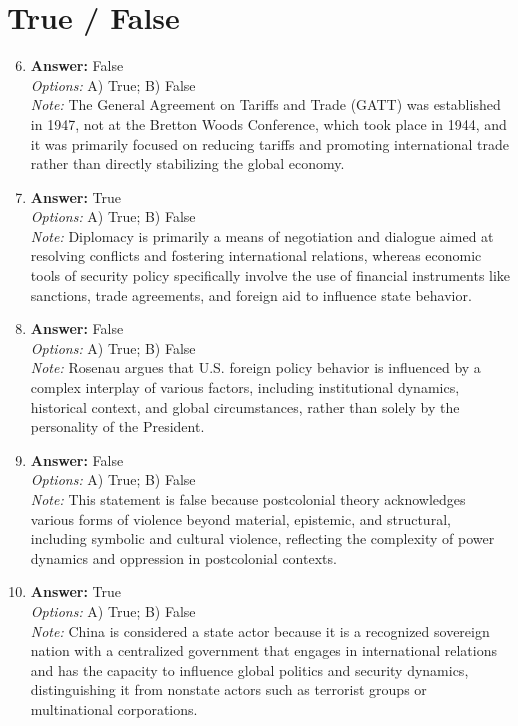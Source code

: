 \documentclass[12pt]{article}
\begin{document}
\section*{True / False}
\begin{enumerate}[label=\arabic*.]
\setcounter{enumi}{5}
\item \textbf{Answer:} False
\\ \textit{Options:} A) True; B) False
\\ \textit{Note:} The General Agreement on Tariffs and Trade (GATT) was established in 1947, not at the Bretton Woods Conference, which took place in 1944, and it was primarily focused on reducing tariffs and promoting international trade rather than directly stabilizing the global economy.
\item \textbf{Answer:} True
\\ \textit{Options:} A) True; B) False
\\ \textit{Note:} Diplomacy is primarily a means of negotiation and dialogue aimed at resolving conflicts and fostering international relations, whereas economic tools of security policy specifically involve the use of financial instruments like sanctions, trade agreements, and foreign aid to influence state behavior.
\item \textbf{Answer:} False
\\ \textit{Options:} A) True; B) False
\\ \textit{Note:} Rosenau argues that U.S. foreign policy behavior is influenced by a complex interplay of various factors, including institutional dynamics, historical context, and global circumstances, rather than solely by the personality of the President.
\item \textbf{Answer:} False
\\ \textit{Options:} A) True; B) False
\\ \textit{Note:} This statement is false because postcolonial theory acknowledges various forms of violence beyond material, epistemic, and structural, including symbolic and cultural violence, reflecting the complexity of power dynamics and oppression in postcolonial contexts.
\item \textbf{Answer:} True
\\ \textit{Options:} A) True; B) False
\\ \textit{Note:} China is considered a state actor because it is a recognized sovereign nation with a centralized government that engages in international relations and has the capacity to influence global politics and security dynamics, distinguishing it from nonstate actors such as terrorist groups or multinational corporations.
\end{enumerate}
\end{document}

